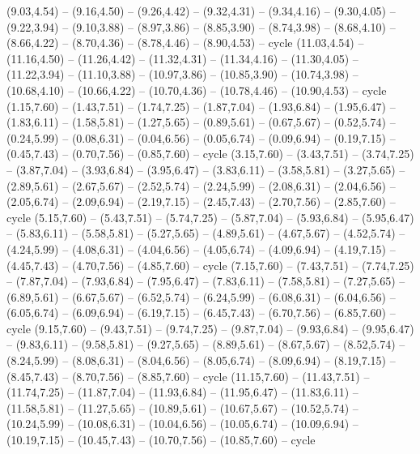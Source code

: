 \expandafter\def\csname geo:Tissot:k23\endcsname{
  (9.03,4.54) -- (9.16,4.50) -- (9.26,4.42) -- (9.32,4.31) -- (9.34,4.16) -- (9.30,4.05) -- (9.22,3.94) -- (9.10,3.88) -- (8.97,3.86) -- (8.85,3.90) -- (8.74,3.98) -- (8.68,4.10) -- (8.66,4.22) -- (8.70,4.36) -- (8.78,4.46) -- (8.90,4.53) -- cycle}
\expandafter\def\csname geo:Tissot:k24\endcsname{
  (11.03,4.54) -- (11.16,4.50) -- (11.26,4.42) -- (11.32,4.31) -- (11.34,4.16) -- (11.30,4.05) -- (11.22,3.94) -- (11.10,3.88) -- (10.97,3.86) -- (10.85,3.90) -- (10.74,3.98) -- (10.68,4.10) -- (10.66,4.22) -- (10.70,4.36) -- (10.78,4.46) -- (10.90,4.53) -- cycle}
\expandafter\def\csname geo:Tissot:k25\endcsname{
  (1.15,7.60) -- (1.43,7.51) -- (1.74,7.25) -- (1.87,7.04) -- (1.93,6.84) -- (1.95,6.47) -- (1.83,6.11) -- (1.58,5.81) -- (1.27,5.65) -- (0.89,5.61) -- (0.67,5.67) -- (0.52,5.74) -- (0.24,5.99) -- (0.08,6.31) -- (0.04,6.56) -- (0.05,6.74) -- (0.09,6.94) -- (0.19,7.15) -- (0.45,7.43) -- (0.70,7.56) -- (0.85,7.60) -- cycle}
\expandafter\def\csname geo:Tissot:k26\endcsname{
  (3.15,7.60) -- (3.43,7.51) -- (3.74,7.25) -- (3.87,7.04) -- (3.93,6.84) -- (3.95,6.47) -- (3.83,6.11) -- (3.58,5.81) -- (3.27,5.65) -- (2.89,5.61) -- (2.67,5.67) -- (2.52,5.74) -- (2.24,5.99) -- (2.08,6.31) -- (2.04,6.56) -- (2.05,6.74) -- (2.09,6.94) -- (2.19,7.15) -- (2.45,7.43) -- (2.70,7.56) -- (2.85,7.60) -- cycle}
\expandafter\def\csname geo:Tissot:k27\endcsname{
  (5.15,7.60) -- (5.43,7.51) -- (5.74,7.25) -- (5.87,7.04) -- (5.93,6.84) -- (5.95,6.47) -- (5.83,6.11) -- (5.58,5.81) -- (5.27,5.65) -- (4.89,5.61) -- (4.67,5.67) -- (4.52,5.74) -- (4.24,5.99) -- (4.08,6.31) -- (4.04,6.56) -- (4.05,6.74) -- (4.09,6.94) -- (4.19,7.15) -- (4.45,7.43) -- (4.70,7.56) -- (4.85,7.60) -- cycle}
\expandafter\def\csname geo:Tissot:k28\endcsname{
  (7.15,7.60) -- (7.43,7.51) -- (7.74,7.25) -- (7.87,7.04) -- (7.93,6.84) -- (7.95,6.47) -- (7.83,6.11) -- (7.58,5.81) -- (7.27,5.65) -- (6.89,5.61) -- (6.67,5.67) -- (6.52,5.74) -- (6.24,5.99) -- (6.08,6.31) -- (6.04,6.56) -- (6.05,6.74) -- (6.09,6.94) -- (6.19,7.15) -- (6.45,7.43) -- (6.70,7.56) -- (6.85,7.60) -- cycle}
\expandafter\def\csname geo:Tissot:k29\endcsname{
  (9.15,7.60) -- (9.43,7.51) -- (9.74,7.25) -- (9.87,7.04) -- (9.93,6.84) -- (9.95,6.47) -- (9.83,6.11) -- (9.58,5.81) -- (9.27,5.65) -- (8.89,5.61) -- (8.67,5.67) -- (8.52,5.74) -- (8.24,5.99) -- (8.08,6.31) -- (8.04,6.56) -- (8.05,6.74) -- (8.09,6.94) -- (8.19,7.15) -- (8.45,7.43) -- (8.70,7.56) -- (8.85,7.60) -- cycle}
\expandafter\def\csname geo:Tissot:k30\endcsname{
  (11.15,7.60) -- (11.43,7.51) -- (11.74,7.25) -- (11.87,7.04) -- (11.93,6.84) -- (11.95,6.47) -- (11.83,6.11) -- (11.58,5.81) -- (11.27,5.65) -- (10.89,5.61) -- (10.67,5.67) -- (10.52,5.74) -- (10.24,5.99) -- (10.08,6.31) -- (10.04,6.56) -- (10.05,6.74) -- (10.09,6.94) -- (10.19,7.15) -- (10.45,7.43) -- (10.70,7.56) -- (10.85,7.60) -- cycle}

